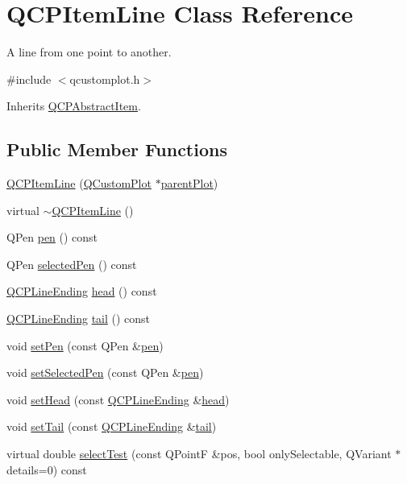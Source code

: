 \hypertarget{class_q_c_p_item_line}{\section{Q\-C\-P\-Item\-Line Class Reference}
\label{class_q_c_p_item_line}
}


A line from one point to another.  




{\ttfamily \#include $<$qcustomplot.\-h$>$}



Inherits \hyperlink{class_q_c_p_abstract_item}{Q\-C\-P\-Abstract\-Item}.

\subsection*{Public Member Functions}
\begin{DoxyCompactItemize}
\item 
\hyperlink{class_q_c_p_item_line_a17804b7f64961c6accf25b61e85142e3}{Q\-C\-P\-Item\-Line} (\hyperlink{class_q_custom_plot}{Q\-Custom\-Plot} $\ast$\hyperlink{class_q_c_p_layerable_ab7e0e94461566093d36ffc0f5312b109}{parent\-Plot})
\item 
virtual \hyperlink{class_q_c_p_item_line_a94b5aaae048171e5306dc4695b991283}{$\sim$\-Q\-C\-P\-Item\-Line} ()
\item 
Q\-Pen \hyperlink{class_q_c_p_item_line_a235779dd079a263bedb20b3daecc40eb}{pen} () const 
\item 
Q\-Pen \hyperlink{class_q_c_p_item_line_a9fde5e95a1a369008252e18f1925650c}{selected\-Pen} () const 
\item 
\hyperlink{class_q_c_p_line_ending}{Q\-C\-P\-Line\-Ending} \hyperlink{class_q_c_p_item_line_a5f6cbc5c763feae9dfbce71748fc43f1}{head} () const 
\item 
\hyperlink{class_q_c_p_line_ending}{Q\-C\-P\-Line\-Ending} \hyperlink{class_q_c_p_item_line_a5d2ca0f784933e80f3e6e1d15dceebb3}{tail} () const 
\item 
void \hyperlink{class_q_c_p_item_line_a572528dab61c1abe205822fbd5db4b27}{set\-Pen} (const Q\-Pen \&\hyperlink{class_q_c_p_item_line_a235779dd079a263bedb20b3daecc40eb}{pen})
\item 
void \hyperlink{class_q_c_p_item_line_a3e2fec44503277e77717e9c24f87f1ea}{set\-Selected\-Pen} (const Q\-Pen \&\hyperlink{class_q_c_p_item_line_a235779dd079a263bedb20b3daecc40eb}{pen})
\item 
void \hyperlink{class_q_c_p_item_line_aebf3d687114d584e0459db6759e2c3c3}{set\-Head} (const \hyperlink{class_q_c_p_line_ending}{Q\-C\-P\-Line\-Ending} \&\hyperlink{class_q_c_p_item_line_a5f6cbc5c763feae9dfbce71748fc43f1}{head})
\item 
void \hyperlink{class_q_c_p_item_line_ac264222c3297a7efe33df9345c811a5f}{set\-Tail} (const \hyperlink{class_q_c_p_line_ending}{Q\-C\-P\-Line\-Ending} \&\hyperlink{class_q_c_p_item_line_a5d2ca0f784933e80f3e6e1d15dceebb3}{tail})
\item 
virtual double \hyperlink{class_q_c_p_item_line_a7541e5d9378ca121d07b0df3b24f7178}{select\-Test} (const Q\-Point\-F \&pos, bool only\-Selectable, Q\-Variant $\ast$details=0) const 
\end{DoxyCompactItemize}

